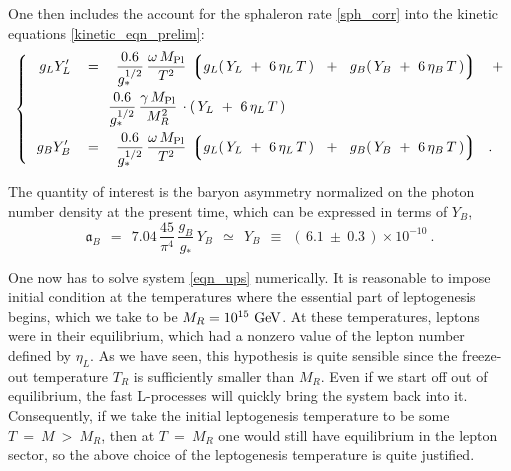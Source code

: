 \documentclass[12pt]{revtex4}
\newcommand{\lgr}{\left\lgroup}
\newcommand{\rgr}{\right\rgroup}
\newcommand{\Mpl}{M_{\rm Pl}}
\newcommand{\GeV}{{\rm GeV}}
\begin{document}
	One then includes the account for the sphaleron rate \eqref{sph_corr}
	into the kinetic equations \eqref{kinetic_eqn_prelim}:
\begin{equation}
\label{eqn_ups}
\left\{~~
\begin{split}
	g_L Y_L' 
	& ~~\;=~~\;
	\frac{0.6}{g_*^{1/2}}\, 
	\frac{\omega\,\Mpl}{T^2}\,
	\lgr g_L (\,Y_L~+~6\,\eta_L\,T\,) ~~+~~ 
	     g_B (\,Y_B~+~6\,\eta_B\,T\,)  \rgr 
	\;~~+
	\\
	& \;\phantom{~~+~~}\;  
	\frac{0.6}{g_*^{1/2}}\, 
	\frac{\gamma\,\Mpl}{M_R^2}\,
	\cdot (\, Y_L ~+~ 6\,\eta_L\,T\,)\\
	g_B Y_B' 
	& ~~\;=~~\;
	\frac{0.6}{g_*^{1/2}}\, 
	\frac{\omega\,\Mpl}{T^2}\,
	\lgr g_L (\,Y_L~+~6\,\eta_L\,T\,) ~~+~~ 
	     g_B (\,Y_B~+~6\,\eta_B\,T\,)  \rgr 
	~~.
\end{split}
\right.
\end{equation}

	The quantity of interest is the baryon asymmetry normalized on the
	photon number density at the present time, which can be expressed
	in terms of $ Y_B $,
\begin{equation}
\label{def_asy}
	\mathfrak{a}_B ~~=~~ 7.04\, \frac{45}{\pi^4}\, \frac{g_B}{g_*}\, Y_B
	~~\simeq~~ Y_B 
		~~\equiv~~ (\, 6.1 ~\pm~ 0.3 \,)\times 10^{-10}~.
\end{equation}

	One now has to solve system \eqref{eqn_ups} numerically.
	It is reasonable to impose initial condition at the temperatures
	where the essential part of leptogenesis begins, which we
	take to be $ M_R = 10^{15}~\GeV $.
	At these temperatures, leptons were in their equilibrium, which
	had a nonzero value of the lepton number defined by $ \eta_L $.
	As we have seen, this hypothesis is quite sensible since 
	the freeze-out temperature $ T_R $ is sufficiently smaller than
	$ M_R $.
	Even if we start off out of equilibrium, the fast L-processes
	will quickly bring the system back into it.
	Consequently, if we take the initial leptogenesis temperature
	to be some $ T ~=~ M ~>~ M_R $, then at $ T~=~M_R $ one would
	still have equilibrium in the lepton sector, so the above
	choice of the leptogenesis temperature is quite justified.
\end{document}
